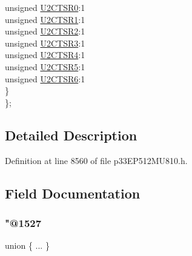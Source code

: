 \begin{DoxyCompactItemize}
\begin{tabbing}
\>\>unsigned \hyperlink{structtag_r_p_i_n_r19_b_i_t_s_a0988d816d07a065eb67692b2e31d78f4}{U2CTSR0}:1\\
\>\>unsigned \hyperlink{structtag_r_p_i_n_r19_b_i_t_s_a7b0ca505ff0b5dbe8a730d39c28a6274}{U2CTSR1}:1\\
\>\>unsigned \hyperlink{structtag_r_p_i_n_r19_b_i_t_s_a0f2bdde98942e1b83bdca70ad6accdf9}{U2CTSR2}:1\\
\>\>unsigned \hyperlink{structtag_r_p_i_n_r19_b_i_t_s_a620a6f43fd55d5dd2d7c7a049d2a934d}{U2CTSR3}:1\\
\>\>unsigned \hyperlink{structtag_r_p_i_n_r19_b_i_t_s_a27747d3937c049a9e987fac54b4a8439}{U2CTSR4}:1\\
\>\>unsigned \hyperlink{structtag_r_p_i_n_r19_b_i_t_s_aaae5697b9d674c7bb310ca1718ea471e}{U2CTSR5}:1\\
\>\>unsigned \hyperlink{structtag_r_p_i_n_r19_b_i_t_s_afa49c1951b0e2d9cfc52831e5f48f7db}{U2CTSR6}:1\\
\>\} \\
\}; \\

\end{tabbing}\end{DoxyCompactItemize}


\subsection{Detailed Description}


Definition at line 8560 of file p33\+E\+P512\+M\+U810.\+h.



\subsection{Field Documentation}
\mbox{\label{structtag_r_p_i_n_r19_b_i_t_s_aef80170f0e90c3ee305e1d801a38327c}} 
\subsubsection{\texorpdfstring{"@1527}{@1527}}
{\footnotesize\ttfamily union \{ ... \} }

\mbox{\label{structtag_r_p_i_n_r19_b_i_t_s_adf71f3d8410c1f1dbbc96680a92c49af}} 
